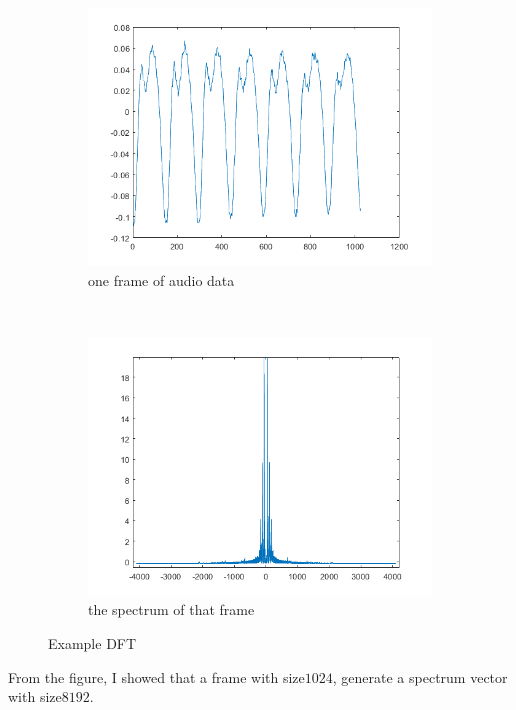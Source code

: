 \documentclass[twoside]{article}
\begin{document}
\begin{figure}[H]
    \centering
    \begin{subfigure}[b]{0.45\textwidth}
        \includegraphics[width=\textwidth]{oneFrame.png}
        \caption{one frame of audio data}
    \end{subfigure}
    ~ %
    \begin{subfigure}[b]{0.45\textwidth}
        \includegraphics[width=\textwidth]{specOneFrame}
        \caption{the spectrum of that frame}
    \end{subfigure}
    \caption{Example DFT}
\end{figure}
\noindent From the figure, I showed that a frame with size$1024$, generate a spectrum vector with size$8192$.
\end{document}
